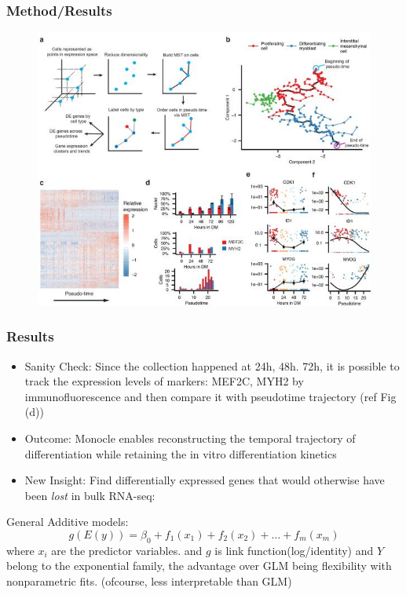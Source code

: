 \documentclass[10pt]{beamer}
\begin{document}
\begin{frame}[fragile]	
	\frametitle{Method/Results}
	\begin{figure}
		\includegraphics{images/expt2}
	\end{figure}
\end{frame}

\begin{frame}
	\frametitle{Results}
	\begin{itemize}[<+- | alert@+>]
		

	\item Sanity Check: Since the collection happened at 24h, 48h. 72h, it is possible to track the expression levels of markers: MEF2C, MYH2 by immunofluorescence and then compare it with pseudotime trajectory (ref Fig (d))
	\item Outcome: Monocle enables reconstructing the temporal trajectory of differentiation while retaining the in vitro differentiation kinetics 
	\item New Insight: Find differentially expressed genes that would otherwise have been
	 \emph{lost} in bulk RNA-seq: 	
	 
	 \end{itemize}
	 \pause
	 General Additive models:
	$$
	g(E(y)) = \beta_0 + f_1(x_1) + f_2(x_2) + \dots + f_m(x_m)
	$$
	where $x_i$ are the predictor variables. and $g$ is link function(log/identity) and $Y$ belong to the exponential family, the advantage over GLM being flexibility with nonparametric fits. (ofcourse, less interpretable than GLM)
\end{frame}
\end{document}
